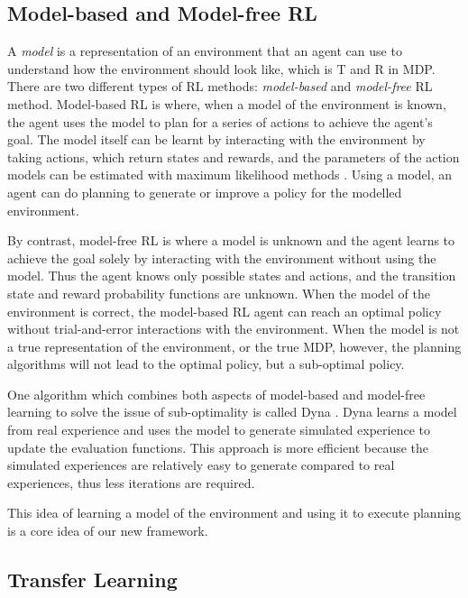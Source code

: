 \documentclass[11pt,twoside]{report}
\theoremstyle{plain}
\theoremstyle{definition}
\begin{document}
\subsection{Model-based and Model-free RL}
\label{model_base_model_free_subsection}
A \textit{model} is a representation of an environment that an agent can use to understand how the environment should look like, which is  T and R in MDP. 
There are two different types of RL methods: \textit{model-based} and \textit{model-free} RL method. 
Model-based RL is where, when a model of the environment is known, the agent uses the model to plan for a series of actions to achieve the agent's goal. 
The model itself can be learnt by interacting with the environment by taking actions, which return states and rewards, and the parameters of the action models can be estimated with maximum likelihood methods \cite{Ray2010}.
Using a model, an agent can do planning to generate or improve a policy for the modelled environment. 

By contrast, model-free RL is where a model is unknown and the agent learns to achieve the goal solely by interacting with the environment without using the model. 
Thus the agent knows only possible states and actions, and the transition state and reward probability functions are unknown.
When the model of the environment is correct, the model-based RL agent can reach an optimal policy without trial-and-error interactions with the environment. 
When the model is not a true representation of the environment, or the true MDP, however, the planning algorithms will not lead to the optimal policy, but a sub-optimal policy.

One algorithm which combines both aspects of model-based and model-free learning to solve the issue of sub-optimality is called Dyna \cite{Sutton1990}.
Dyna learns a model from real experience and uses the model to generate simulated experience to update the evaluation functions.
This approach is more efficient because the simulated experiences are relatively easy to generate compared to real experiences, thus less iterations are required.

This idea of learning a model of the environment and using it to execute planning is a core idea of our new framework. 

\subsection{Transfer Learning}
\label{transfer_learning}
\end{document}
